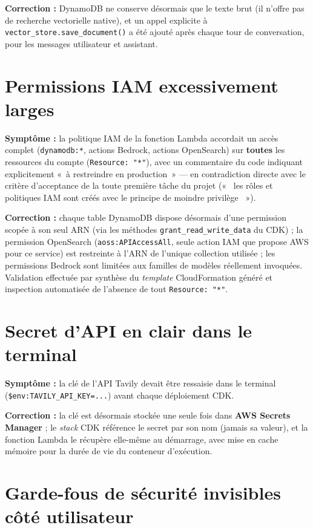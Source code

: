 \documentclass[11pt,a4paper]{report}
\begin{document}
\textbf{Correction :} DynamoDB ne conserve désormais que le texte brut
(il n'offre pas de recherche vectorielle native), et un appel explicite
à \texttt{vector\_store.save\_document()} a été ajouté après chaque
tour de conversation, pour les messages utilisateur et assistant.

\section{Permissions IAM excessivement larges}
\label{sec:bug-iam}

\textbf{Symptôme :} la politique IAM de la fonction Lambda accordait
un accès complet (\texttt{dynamodb:*}, actions Bedrock, actions
OpenSearch) sur \textbf{toutes} les ressources du compte
(\texttt{Resource: "*"}), avec un commentaire du code indiquant
explicitement « à restreindre en production » — en contradiction
directe avec le critère d'acceptance de la toute première tâche du
projet («  les rôles et politiques IAM sont créés avec le principe de
moindre privilège  »).

\textbf{Correction :} chaque table DynamoDB dispose désormais d'une
permission scopée à son seul ARN (via les méthodes
\texttt{grant\_read\_write\_data} du CDK) ; la permission OpenSearch
(\texttt{aoss:APIAccessAll}, seule action IAM que propose AWS pour ce
service) est restreinte à l'ARN de l'unique collection utilisée ; les
permissions Bedrock sont limitées aux familles de modèles réellement
invoquées. Validation effectuée par synthèse du \textit{template}
CloudFormation généré et inspection automatisée de l'absence de tout
\texttt{Resource: "*"}.

\section{Secret d'API en clair dans le terminal}

\textbf{Symptôme :} la clé de l'API Tavily devait être ressaisie dans
le terminal (\texttt{\$env:TAVILY\_API\_KEY=...}) avant chaque
déploiement CDK.

\textbf{Correction :} la clé est désormais stockée une seule fois dans
\textbf{AWS Secrets Manager} ; le \textit{stack} CDK référence le
secret par son nom (jamais sa valeur), et la fonction Lambda le
récupère elle-même au démarrage, avec mise en cache mémoire pour la
durée de vie du conteneur d'exécution.

\section{Garde-fous de sécurité invisibles côté utilisateur}
\end{document}
